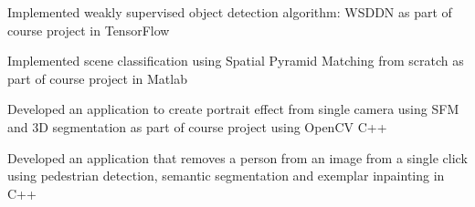 \documentclass[]{deedy-resume-openfont}
\begin{document}
\begin{minipage}[t]{0.36\textwidth}


\descript{}
Implemented weakly supervised object detection algorithm: WSDDN as part of course project in TensorFlow
\sectionsep


\descript{}
Implemented scene classification using Spatial Pyramid Matching from scratch as part of course project in Matlab
\sectionsep

\descript{}
Developed an application to create portrait effect from single camera using SFM and 3D segmentation as part of course project using OpenCV C++
\sectionsep

\descript{}
Developed an application that removes a person from an image from a single click using pedestrian detection, semantic segmentation and exemplar inpainting in C++
\sectionsep










\end{minipage}
\end{document}
